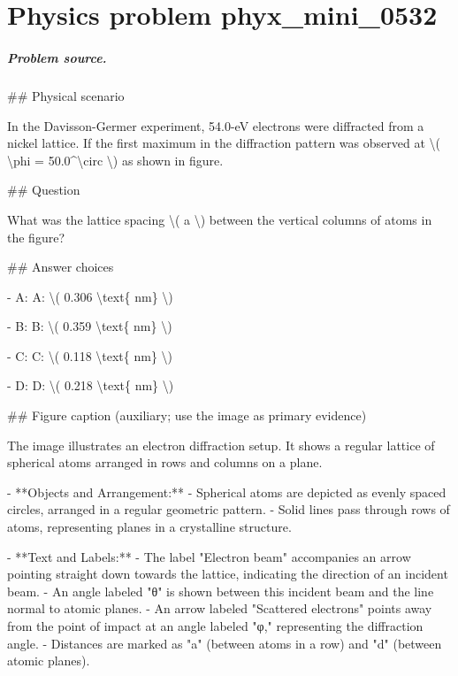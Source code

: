 
\chapter{Physics problem phyx\_mini\_0532}
\label{ch:PhyXMiniProblems_problem_phyx_mini_0532}

\paragraph{Problem source.}
\#\# Physical scenario

In the Davisson-Germer experiment, 54.0-eV electrons were diffracted from a nickel lattice. If the first maximum in the diffraction pattern was observed at \textbackslash{}( \textbackslash{}phi = 50.0\textasciicircum{}\textbackslash{}circ \textbackslash{}) as shown in figure.

\#\# Question

What was the lattice spacing \textbackslash{}( a \textbackslash{}) between the vertical columns of atoms in the figure?

\#\# Answer choices

- A: A: \textbackslash{}( 0.306 \textbackslash{}text\{ nm\} \textbackslash{})

- B: B: \textbackslash{}( 0.359 \textbackslash{}text\{ nm\} \textbackslash{})

- C: C: \textbackslash{}( 0.118 \textbackslash{}text\{ nm\} \textbackslash{})

- D: D: \textbackslash{}( 0.218 \textbackslash{}text\{ nm\} \textbackslash{})

\#\# Figure caption (auxiliary; use the image as primary evidence)

The image illustrates an electron diffraction setup. It shows a regular lattice of spherical atoms arranged in rows and columns on a plane. 

- **Objects and Arrangement:**
  - Spherical atoms are depicted as evenly spaced circles, arranged in a regular geometric pattern.
  - Solid lines pass through rows of atoms, representing planes in a crystalline structure.

- **Text and Labels:**
  - The label "Electron beam" accompanies an arrow pointing straight down towards the lattice, indicating the direction of an incident beam.
  - An angle labeled "θ" is shown between this incident beam and the line normal to atomic planes.
  - An arrow labeled "Scattered electrons" points away from the point of impact at an angle labeled "φ," representing the diffraction angle.
  - Distances are marked as "a" (between atoms in a row) and "d" (between atomic planes).

